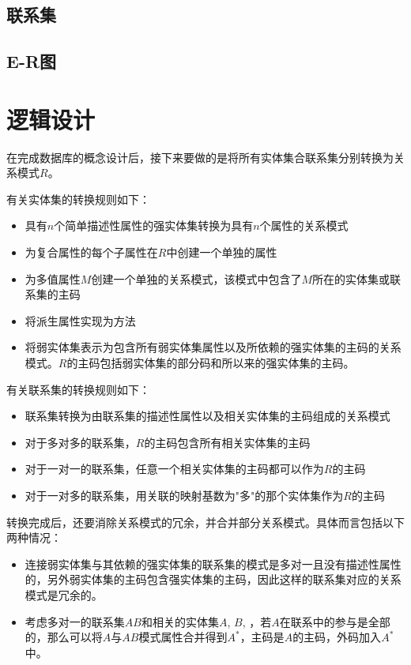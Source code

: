 \documentclass{myreport}
\begin{document}
\subsection{联系集}
\subsection{E-R图}

\section{逻辑设计}

在完成数据库的概念设计后，接下来要做的是将所有实体集合联系集分别转换为关系模式$R$。

有关实体集的转换规则如下：

\begin{itemize}
	\item 具有$n$个简单描述性属性的强实体集转换为具有$n$个属性的关系模式
	\item 为复合属性的每个子属性在$R$中创建一个单独的属性
	\item 为多值属性$M$创建一个单独的关系模式，该模式中包含了$M$所在的实体集或联系集的主码
	\item 将派生属性实现为方法
	\item 将弱实体集表示为包含所有弱实体集属性以及所依赖的强实体集的主码的关系模式。$R$的主码包括弱实体集的部分码和所以来的强实体集的主码。
\end{itemize}

有关联系集的转换规则如下：

\begin{itemize}
	\item 联系集转换为由联系集的描述性属性以及相关实体集的主码组成的关系模式
	\item 对于多对多的联系集，$R$的主码包含所有相关实体集的主码
	\item 对于一对一的联系集，任意一个相关实体集的主码都可以作为$R$的主码
	\item 对于一对多的联系集，用关联的映射基数为"多"的那个实体集作为$R$的主码
\end{itemize}

转换完成后，还要消除关系模式的冗余，并合并部分关系模式。具体而言包括以下两种情况：

\begin{itemize}
	\item 连接弱实体集与其依赖的强实体集的联系集的模式是多对一且没有描述性属性的，另外弱实体集的主码包含强实体集的主码，因此这样的联系集对应的关系模式是冗余的。
	\item 考虑多对一的联系集$AB$和相关的实体集$A$, $B$, ，若$A$在联系中的参与是全部的，那么可以将$A$与$AB$模式属性合并得到$A^*$，主码是$A$的主码，外码加入$A^*$中。
\end{itemize}
\end{document}
